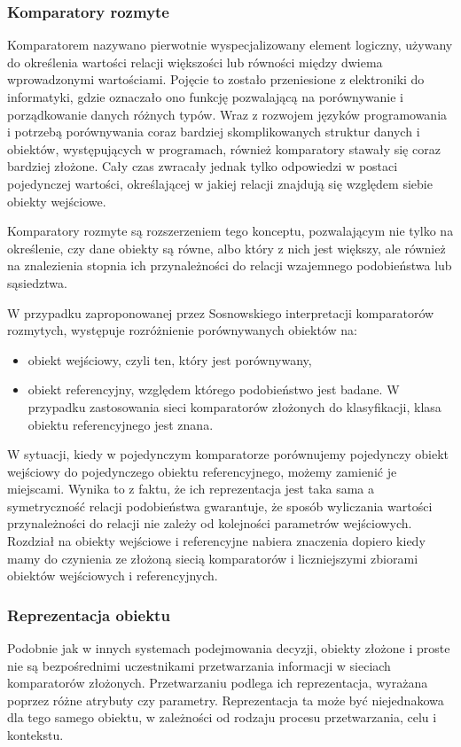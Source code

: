 \documentclass{pracalicmgr}
\begin{document}
    \subsubsection{Komparatory rozmyte}
    Komparatorem nazywano pierwotnie wyspecjalizowany element logiczny, używany do określenia wartości relacji większości lub równości między dwiema wprowadzonymi wartościami. Pojęcie to zostało przeniesione z elektroniki do informatyki, gdzie oznaczało ono funkcję pozwalającą na porównywanie i porządkowanie danych różnych typów. Wraz z rozwojem języków programowania i potrzebą porównywania coraz bardziej skomplikowanych struktur danych i obiektów, występujących w programach, również komparatory stawały się coraz bardziej złożone. Cały czas zwracały jednak tylko odpowiedzi w postaci pojedynczej wartości, określającej w jakiej relacji znajdują się względem siebie obiekty wejściowe.
    
    Komparatory rozmyte są rozszerzeniem tego konceptu, pozwalającym nie tylko na określenie, czy dane obiekty są równe, albo który z nich jest większy, ale również na znalezienia stopnia ich przynależności do relacji wzajemnego podobieństwa lub sąsiedztwa. 
    
    W przypadku zaproponowanej przez Sosnowskiego interpretacji komparatorów rozmytych, występuje rozróżnienie porównywanych obiektów na:
    \begin{itemize}
        \item obiekt wejściowy, czyli ten, który jest porównywany,
        \item obiekt referencyjny, względem którego podobieństwo jest badane. W przypadku zastosowania sieci komparatorów złożonych do klasyfikacji, klasa obiektu referencyjnego jest znana. 
    \end{itemize}
    W sytuacji, kiedy w pojedynczym komparatorze porównujemy pojedynczy obiekt wejściowy do pojedynczego obiektu referencyjnego, możemy zamienić je miejscami. Wynika to z faktu, że ich reprezentacja jest taka sama a symetryczność relacji podobieństwa gwarantuje, że sposób wyliczania wartości przynależności do relacji nie zależy od kolejności parametrów wejściowych. Rozdział na obiekty wejściowe i referencyjne nabiera znaczenia dopiero kiedy mamy do czynienia ze złożoną siecią komparatorów i liczniejszymi zbiorami obiektów wejściowych i referencyjnych.
    \subsubsection{Reprezentacja obiektu}
    Podobnie jak w innych systemach podejmowania decyzji, obiekty złożone i proste nie są bezpośrednimi uczestnikami przetwarzania informacji w sieciach komparatorów złożonych. Przetwarzaniu podlega ich reprezentacja, wyrażana poprzez różne atrybuty czy parametry. Reprezentacja ta może być niejednakowa dla tego samego obiektu, w zależności od rodzaju procesu przetwarzania, celu i kontekstu.
    
\end{document}
